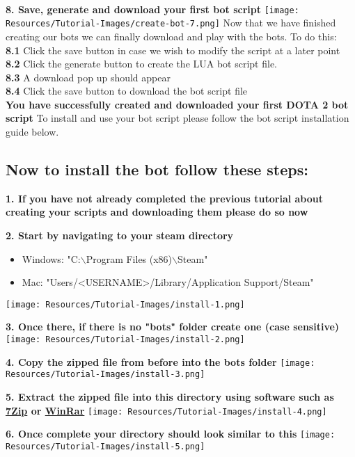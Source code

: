 \documentclass{article}
\begin{document}
\begin{flushleft}
\textbf{\\8. Save, generate and download your first bot script}
\texttt{[image: Resources/Tutorial-Images/create-bot-7.png]}
Now that we have finished creating our bots we can finally download and play with the bots. To do this:\\
\textbf{8.1} Click the save button in case we wish to modify the script at a later point\\
\textbf{8.2} Click the generate button to create the LUA bot script file.\\
\textbf{8.3} A download pop up should appear\\
\textbf{8.4} Click the save button to download the bot script file
\textbf{\\You have successfully created and downloaded your first DOTA 2 bot script}
To install and use your bot script please follow the bot script installation guide below. 
\end{flushleft}

\subsection*{Now to install the bot follow these steps:}
\begin{flushleft}
\textbf{1. If you have not already completed the previous tutorial about creating your scripts and downloading them please do so now}

\textbf{2. Start by navigating to your steam directory}
\begin{itemize}
	\item Windows: "C:$\backslash$Program Files (x86)$\backslash$Steam"
	\item Mac: "Users/\textless USERNAME\textgreater/Library/Application Support/Steam"
\end{itemize}
\texttt{[image: Resources/Tutorial-Images/install-1.png]}

\textbf{3. Once there, if there is no "bots" folder create one (case sensitive)}
\texttt{[image: Resources/Tutorial-Images/install-2.png]}

\textbf{4. Copy the zipped file from before into the bots folder}
\texttt{[image: Resources/Tutorial-Images/install-3.png]}

\textbf{5. Extract the zipped file into this directory using software such as \href{https://www.7-zip.org/}{7Zip} or \href{https://www.win-rar.com/}{WinRar}}
\texttt{[image: Resources/Tutorial-Images/install-4.png]}

\textbf{6. Once complete your directory should look similar to this}
\texttt{[image: Resources/Tutorial-Images/install-5.png]}

\end{flushleft}
\end{document}

